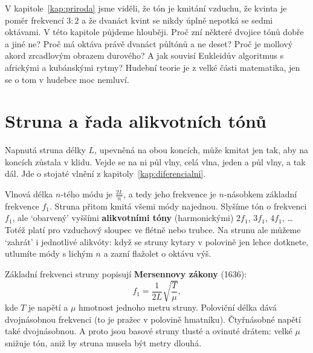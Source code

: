 \label{kap:hudba}

V kapitole~\ref{kap:priroda} jsme viděli, že tón je kmitání vzduchu, že kvinta je poměr frekvencí $3:2$ a že dvanáct kvint se nikdy úplně nepotká se sedmi oktávami. V této kapitole půjdeme hlouběji. Proč zní některé dvojice tónů dobře a jiné ne? Proč má oktáva právě dvanáct půltónů a ne deset? Proč je mollový akord zrcadlovým obrazem durového? A jak souvisí Eukleidův algoritmus s africkými a kubánskými rytmy? Hudební teorie je z velké části matematika, jen se o tom v hudebce moc nemluví.

\section{Struna a řada alikvotních tónů}

Napnutá struna délky $L$, upevněná na obou koncích, může kmitat jen tak, aby na koncích zůstala v klidu. Vejde se na ni půl vlny, celá vlna, jeden a půl vlny, a tak dál. Jde o stojaté vlnění z kapitoly~\ref{kap:diferencialni}.

\begin{center}
\end{center}

Vlnová délka $n$-tého módu je $\frac{2L}{n}$, a tedy jeho frekvence je $n$-násobkem základní frekvence $f_1$. Struna přitom kmitá všemi módy najednou. Slyšíme tón o frekvenci $f_1$, ale `obarvený' vyššími \textbf{alikvotními tóny} (harmonickými) $2f_1$, $3f_1$, $4f_1$, \dots Totéž platí pro vzduchový sloupec ve flétně nebo trubce. Na strunu ale můžeme `zahrát' i jednotlivé alikvóty: když se struny kytary v polovině jen lehce dotknete, utlumíte módy s lichým $n$ a zazní flažolet o oktávu výš.

Základní frekvenci struny popisují \textbf{Mersennovy zákony} (1636):
\begin{equation*}
  f_1 = \frac{1}{2L}\sqrt{\frac{T}{\mu}},
\end{equation*}
kde $T$ je napětí a $\mu$ hmotnost jednoho metru struny. Poloviční délka dává dvojnásobnou frekvenci (to je pražec v polovině hmatníku). Čtyřnásobné napětí také dvojnásobnou. A proto jsou basové struny tlusté a ovinuté drátem: velké $\mu$ snižuje tón, aniž by struna musela být metry dlouhá.

